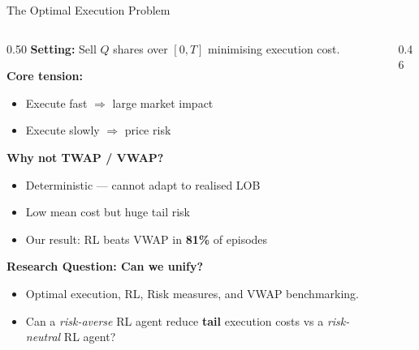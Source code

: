 \documentclass[aspectratio=169, 10pt]{beamer}
\begin{document}
\begin{frame}{The Optimal Execution Problem}
  \begin{columns}[T]
    \begin{column}{0.50\textwidth}
      \textbf{Setting:} Sell $Q$ shares over $[0,T]$
      minimising execution cost.

      \medskip
      \textbf{Core tension:}
      \begin{itemize}
        \item \alert{Execute fast} $\Rightarrow$ large market impact
        \item \alert{Execute slowly} $\Rightarrow$ price risk
      \end{itemize}

      \medskip
      \textbf{Why not TWAP / VWAP?}
      \begin{itemize}
        \item Deterministic — cannot adapt to realised LOB
        \item Low mean cost but \alert{huge tail risk}
        \item Our result: RL beats VWAP in \textbf{81\%} of episodes
      \end{itemize}

      \medskip
      \textbf{Research Question: Can we unify?}
      \begin{itemize}
        \item Optimal execution, RL, Risk measures, and VWAP benchmarking.
        \item Can a \emph{risk-averse} RL agent reduce \textbf{tail} execution costs vs a \emph{risk-neutral} RL agent?
      \end{itemize}
    \end{column}
    
    \begin{column}{0.46\textwidth}
      \centering
    \end{column}
  \end{columns}
\end{frame}
\end{document}
